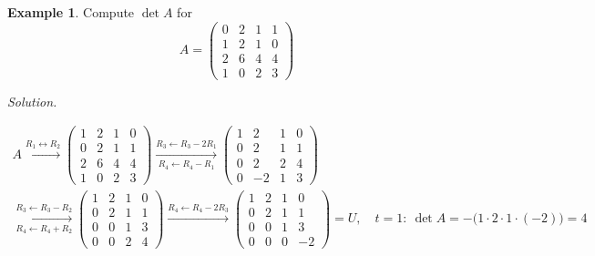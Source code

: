 \documentclass[12pt]{article}
\theoremstyle{definition}
\newtheorem{example}[theorem]{Example}
\begin{document}
\begin{example}\label{b5.16}
Compute \(\det A\) for
\[
A=\begin{pmatrix}0&2&1&1\\1&2&1&0\\2&6&4&4\\1&0&2&3\end{pmatrix}
\]
\end{example}
\textit{Solution.}
\begin{board}[\(a_{11}=0\): begin with an interchange; then additions (Theorem~\ref{b5.15}):]
\[
\begin{gathered}
A\xrightarrow{R_1\leftrightarrow R_2}
\begin{pmatrix}1&2&1&0\\0&2&1&1\\2&6&4&4\\1&0&2&3\end{pmatrix}
\xrightarrow[R_4\leftarrow R_4-R_1]{R_3\leftarrow R_3-2R_1}
\begin{pmatrix}1&2&1&0\\0&2&1&1\\0&2&2&4\\0&-2&1&3\end{pmatrix}\\
\xrightarrow[R_4\leftarrow R_4+R_2]{R_3\leftarrow R_3-R_2}
\begin{pmatrix}1&2&1&0\\0&2&1&1\\0&0&1&3\\0&0&2&4\end{pmatrix}
\xrightarrow{R_4\leftarrow R_4-2R_3}
\begin{pmatrix}1&2&1&0\\0&2&1&1\\0&0&1&3\\0&0&0&-2\end{pmatrix}=U,\quad
t=1:\ \det A=-\bigl(1\cdot2\cdot1\cdot(-2)\bigr)=4
\end{gathered}
\]
\end{board}
\end{document}
